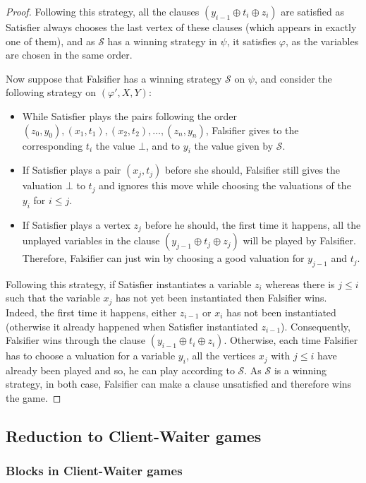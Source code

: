 \documentclass{article}
\newcommand{\strat}{\mathcal{S}}
\begin{document}
\begin{proof}
Following this strategy, all the clauses $(y_{i-1} \oplus t_i \oplus z_i)$ are satisfied as Satisfier always chooses the last vertex of these clauses (which appears in exactly one of them), and as $\strat$ has a winning strategy in $\psi$, it satisfies $\varphi$, as the variables are chosen in the same order.

Now suppose that Falsifier has a winning strategy $\strat$ on $\psi$, and consider the following strategy on $(\varphi', X, Y)$:

\begin{itemize}
    \item While Satisfier plays the pairs following the order $(z_0, y_0), (x_1, t_1), (x_2, t_2), \dots, (z_n, y_n)$, Falsifier gives to the corresponding $t_i$ the value $\bot$, and to $y_i$ the value given by $\strat$.
    \item If Satisfier plays a pair $(x_j, t_j)$ before she should, Falsifier still gives the valuation $\bot$ to $t_j$ and ignores this move while choosing the valuations of the $y_i$ for $i\le j$.
    \item If Satisfier plays a vertex $z_j$ before he should, the first time it happens, all the unplayed variables in the clause $(y_{j-1} \oplus t_j \oplus z_j)$ will be played by Falsifier. Therefore, Falsifier can just win by choosing a good valuation for $y_{j-1}$ and $t_j$.
\end{itemize}

Following this strategy, if Satisfier instantiates a variable $z_i$ whereas there is $j\le i$ such that the variable $x_j$ has not yet been instantiated then Falsifier wins. Indeed, the first time it happens, either $z_{i-1}$ or $x_i$ has not been instantiated (otherwise it already happened when Satisfier instantiated $z_{i-1}$). Consequently, Falsifier wins through the clause $(y_{i-1} \oplus t_i \oplus z_i)$. Otherwise, each time Falsifier has to choose a valuation for a variable $y_i$, all the vertices $x_j$ with $j \le i$ have already been played and so, he can play according to $\strat$. As $\strat$ is a winning strategy, in both case, Falsifier can make a clause unsatisfied and therefore wins the game.
\end{proof}


\subsection{Reduction to Client-Waiter games}

\subsubsection{Blocks in Client-Waiter games}\label{subsection blocks}
\end{document}
